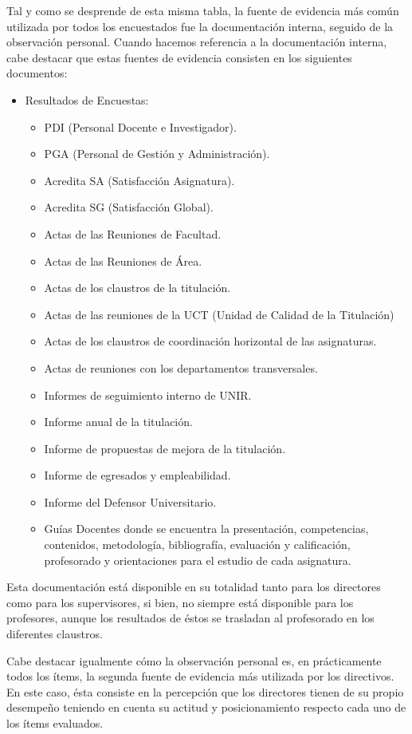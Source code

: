 \documentclass[spanish]{textolivre}
\begin{document}
Tal y como se desprende de esta misma tabla, la fuente de evidencia más común utilizada por todos los encuestados fue la documentación interna, seguido de la observación personal. Cuando hacemos referencia a la documentación interna, cabe destacar que estas fuentes de evidencia consisten en los siguientes documentos: 

\begin{itemize}
 \item Resultados de Encuestas:
 \begin{itemize}
 \item PDI (Personal Docente e Investigador).
 \item PGA (Personal de Gestión y Administración).
 \item Acredita SA (Satisfacción Asignatura).
 \item Acredita SG (Satisfacción Global).
 \item Actas de las Reuniones de Facultad.
 \item Actas de las Reuniones de Área.
 \item Actas de los claustros de la titulación.
 \item Actas de las reuniones de la UCT (Unidad de Calidad de la Titulación)
 \item Actas de los claustros de coordinación horizontal de las asignaturas.
 \item Actas de reuniones con los departamentos transversales.
 \item Informes de seguimiento interno de UNIR.
 \item Informe anual de la titulación.
 \item Informe de propuestas de mejora de la titulación.
 \item Informe de egresados y empleabilidad.
 \item Informe del Defensor Universitario.
 \item Guías Docentes donde se encuentra la presentación, competencias, contenidos, metodología, bibliografía, evaluación y calificación, profesorado y orientaciones para el estudio de cada asignatura.
 \end{itemize}
\end{itemize}

Esta documentación está disponible en su totalidad tanto para los directores como para los supervisores, si bien, no siempre está disponible para los profesores, aunque los resultados de éstos se trasladan al profesorado en los diferentes claustros.

Cabe destacar igualmente cómo la observación personal es, en prácticamente todos los ítems, la segunda fuente de evidencia más utilizada por los directivos. En este caso, ésta consiste en la percepción que los directores tienen de su propio desempeño teniendo en cuenta su actitud y posicionamiento respecto cada uno de los ítems evaluados.
\end{document}

